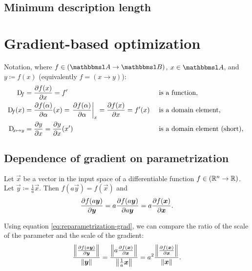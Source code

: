 \documentclass[twocolumn]{article}
\begin{document}
\subsection{Minimum description length}


\section{Gradient-based optimization}

Notation, where $f\in(\set A\to\set B)$, $x\in \set A$, and $y \coloneqq f(x)$ (equivalently $f=(x\to y)$):
\begin{align}
    \Dif_f &= \pd{f(x)}{x} = f' &&\text{ is a function,} \\
    \Dif_f(x) &= \pd{f(\alpha)}{\alpha}(x) = \eval{\pd{f(\alpha)}{\alpha}}_{x} = \pd{f(x)}{x} = f'(x) &&\text{ is a domain element, } \\
    \Dif_{x\mapsto y} &= \pd{y}{x} = \pd{y}{x}(x') &&\text{ is a domain element (short), }
\end{align}

\subsection{Dependence of gradient on parametrization}

Let $\vec x$ be a vector in the input space of a differentiable function $f\in\del{\R^n\to\R}$. Let $\vec y \coloneqq \frac{1}{a}\vec x$. Then $f(a\vec y)=f(\vec x)$ and
\begin{align}
    \pd{f\del{a\vec y}}{\vec y} = a\pd{f(a\vec y)}{a\vec y} = a\pd{f(\vec x)}{\vec x} \text{.}  \label{eq:reparametrization-grad}
\end{align}

Using equation \eqref{eq:reparametrization-grad}, we can compare the ratio of the scale of the parameter and the scale of the gradient:
\begin{align}
    \frac{\enVert{\pd{f\del{a\vec y}}{\vec y}}}{\enVert{\vec y}}
    = \frac{\enVert{a\pd{f(\vec x)}{\vec x}}}{\enVert{\frac{1}{a}\vec x}}
    = a^2\frac{\enVert{\pd{f(\vec x)}{\vec x}}}{\enVert{\vec x}} \text{.}
\end{align}
\end{document}
